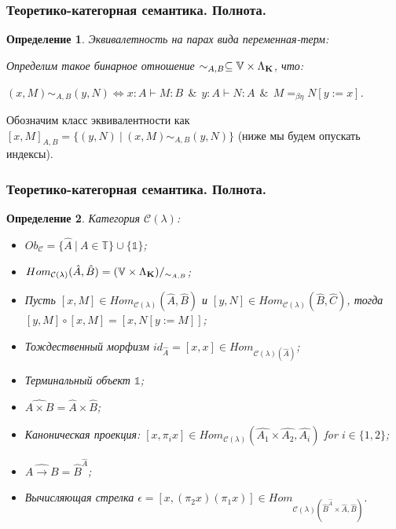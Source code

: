 \documentclass[10pt,pdf,utf8,russian,aspectratio=169]{beamer}
\newtheorem{defin}{Определение}
\begin{document}
\begin{frame}
  \frametitle{Теоретико-категорная семантика. Полнота.}

  \begin{defin} Эквивалетность на парах вида переменная-терм:
    $ $

    Определим такое бинарное отношение  $\sim_{A, B} \subseteq \mathbb{V} \times \Lambda_{{\bf K}}$, что:

    $(x, M) \sim_{A, B} (y, N) \Leftrightarrow x : A \vdash M : B \:\: \& \:\: y : A \vdash N : A \:\: \& \:\: M =_{\beta \eta} N [y := x]$.
  \end{defin}

Обозначим класс эквивалентности как $[x, M]_{A, B} = \{ (y, N) \: | \: (x, M) \sim_{A, B} (y, N) \}$ (ниже мы будем опускать индексы).

\end{frame}

\begin{frame}
  \frametitle{Теоретико-категорная семантика. Полнота.}

  \begin{defin} Категория $\mathcal{C}(\lambda)$:
  \begin{itemize}
    \item $Ob_{\mathcal{C}} = \{ \hat{A} \: | \: A \in \mathbb{T} \} \cup \{ \mathds{1} \}$;
    \item $Hom_{\mathcal{C}(\lambda)}(\hat{A},\hat{B}) = (\mathbb{V} \times \Lambda_{{\bf K}})/_{\sim_{A, B}}$;
    \item Пусть $[x, M] \in Hom_{\mathcal{C}(\lambda)}(\hat{A},\hat{B})$ и $[y,N] \in Hom_{\mathcal{C}(\lambda)}(\hat{B},\hat{C})$, тогда $[y,M] \circ [x, M] = [x, N [y := M]]$;
    \item Тождественный морфизм $id_{\hat{A}} = [x,x] \in Hom_{\mathcal{C}(\lambda)(\hat{A})}$;
    \item Терминальный объект $\mathds{1}$;
    \item $\widehat{A \times B} = \hat{A} \times \hat{B}$;
    \item Каноническая проекция: $[x, \pi_i x] \in Hom_{\mathcal{C}(\lambda)}(\hat{A_1} \times \hat{A_2},\hat{A_i})$ for $i \in \{ 1, 2 \}$;
    \item $\widehat{A \to B} = \hat{B}^{\hat{A}}$;
    \item Вычисляющая стрелка $\epsilon = [x, (\pi_2 x) (\pi_1 x)] \in Hom_{\mathcal{C}(\lambda)(\hat{B}^{\hat{A}} \times \hat{A}, \hat{B})}$.
  \end{itemize}
  \end{defin}

\end{frame}
\end{document}
